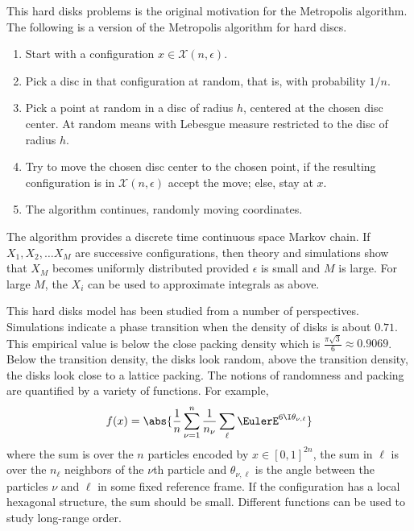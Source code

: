 \documentclass[12pt]{article}
\begin{document}
This hard disks problems is the original motivation for the Metropolis
algorithm.%
The following is a version of the Metropolis algorithm for hard discs.
\begin{enumerate}
    \item
        Start with a configuration \( x \in \mathcal{X}(n,\epsilon) \).
    \item
        Pick a disc in that configuration at random, that is, with
        probability \( 1/n \).
    \item
        Pick a point at random in a disc of radius \( h \), centered at
        the chosen disc center.  At random means with Lebesgue measure
        restricted to the disc of radius \( h \).
    \item
        Try to move the chosen disc center to the chosen point, if the
        resulting configuration is in \( \mathcal{X}(n,\epsilon) \)
        accept the move; else, stay at \( x \).
    \item
        The algorithm continues, randomly moving coordinates.
\end{enumerate}
The algorithm provides a discrete time continuous space Markov chain. If
\( X_1, X_2, \dots X_M \) are successive configurations, then theory and
simulations show that \( X_M \) becomes uniformly distributed provided \(
\epsilon \) is small and \( M \) is large.  For large \( M \), the \( X_i
\) can be used to approximate integrals as above.

This hard disks model has been studied from a number of perspectives.
Simulations indicate a phase transition when the density of disks is
about \( 0.71 \).  This empirical value is below the close packing
density which is \( \frac{\pi \sqrt{3}}{6} \approx 0.9069 \). Below the
transition density, the disks look random, above the transition density,
the disks look close to a lattice packing.  The notions of randomness
and packing are quantified by a variety of functions.  For example,
\[
    f(x) = \abs{ \frac{1}{n} \sum\limits_{\nu=1}^n \frac{1}{n_\nu} \sum\limits_\ell
    \EulerE^{6 \I \theta_{\nu,\ell}}}
\] where the sum is over the \( n \) particles encoded by \( x \in [0,1]^
{2n} \), the sum in \( \ell \) is over the \( n_\ell \) neighbors of the
\( \nu \)th particle and \( \theta_{\nu,\ell} \) is the angle between
the particles \( \nu \) and \( \ell \) in some fixed reference frame.
If the configuration has a local hexagonal structure, the sum should be
small. Different functions can be used to study long-range order.
\end{document}
